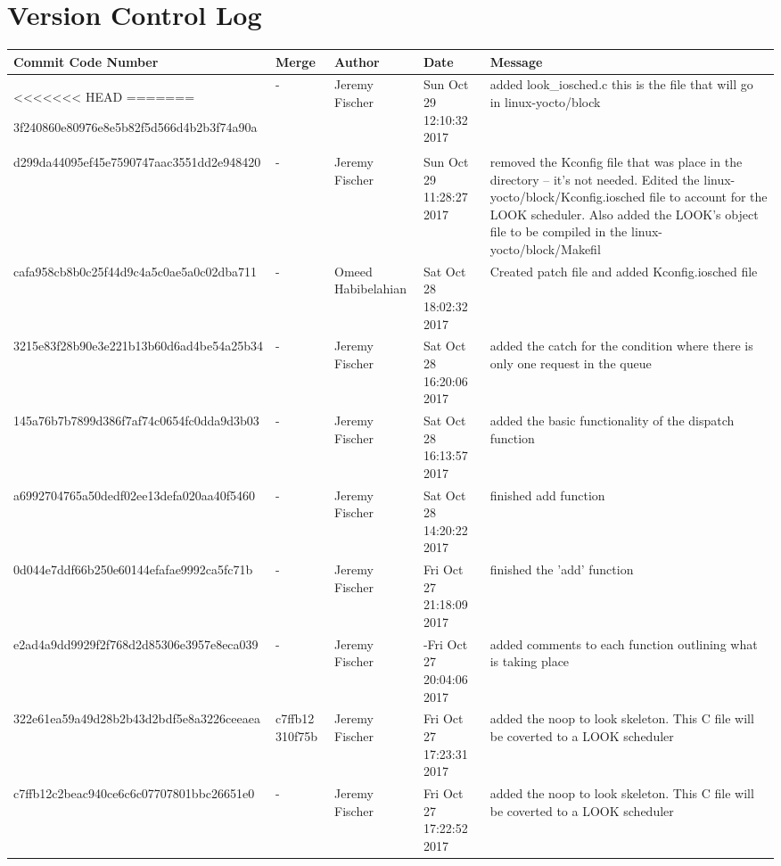 \documentclass[draftclsnofoot, onecolumn, 10pt, compsoc]{IEEEtran}
\begin{document}
	\section{Version Control Log}
		\begin{tabular}{| p{6.8cm} | p{1.3cm} | p{2.5cm} | p{2cm} | p{4.2cm} |}
			\hline
			Commit Code Number & Merge & Author & Date & Message \\ \hline
<<<<<<< HEAD
=======

			3f240860e80976e8e5b82f5d566d4b2b3f74a90a
			& -
			& Jeremy Fischer
			& Sun Oct 29 12:10:32 2017
			& added look\_iosched.c this is the file that will go in linux-yocto/block \\
			\hline

			d299da44095ef45e7590747aac3551dd2e948420
			& -
			& Jeremy Fischer
			& Sun Oct 29 11:28:27 2017
			& removed the Kconfig file that was place in the directory -- it's not needed. Edited the linux-yocto/block/Kconfig.iosched file to account for the LOOK scheduler. Also added the LOOK's object file to be compiled in the linux-yocto/block/Makefil \\
			\hline

			cafa958cb8b0c25f44d9c4a5c0ae5a0c02dba711
			& -
			& Omeed Habibelahian
			& Sat Oct 28 18:02:32 2017
			& Created patch file and added Kconfig.iosched file \\
			\hline

			3215e83f28b90e3e221b13b60d6ad4be54a25b34
			& -
			& Jeremy Fischer
			& Sat Oct 28 16:20:06 2017
			& added the catch for the condition where there is only one request in the queue \\
			\hline

			145a76b7b7899d386f7af74c0654fc0dda9d3b03
			& -
			& Jeremy Fischer
			& Sat Oct 28 16:13:57 2017
			& added the basic functionality of the dispatch function \\
			\hline

			a6992704765a50dedf02ee13defa020aa40f5460
			& - 
			& Jeremy Fischer
			& Sat Oct 28 14:20:22 2017
			& finished add function \\
			\hline

			0d044e7ddf66b250e60144efafae9992ca5fc71b
			& -
			& Jeremy Fischer
			& Fri Oct 27 21:18:09 2017
    			& finished the 'add' function \\
			\hline

			e2ad4a9dd9929f2f768d2d85306e3957e8eca039
			& -
			& Jeremy Fischer
			& -Fri Oct 27 20:04:06 2017
			& added comments to each function outlining what is taking place \\
			\hline

			322e61ea59a49d28b2b43d2bdf5e8a3226ceeaea
			& c7ffb12 310f75b
			& Jeremy Fischer
			& Fri Oct 27 17:23:31 2017
			& added the noop to look skeleton. This C file will be coverted to a LOOK scheduler \\
			\hline
			
			c7ffb12c2beac940ce6c6c07707801bbc26651e0
			& -
			& Jeremy Fischer
			& Fri Oct 27 17:22:52 2017
			& added the noop to look skeleton. This C file will be coverted to a LOOK scheduler \\
			\hline
		\end{tabular}
		
\end{document}
